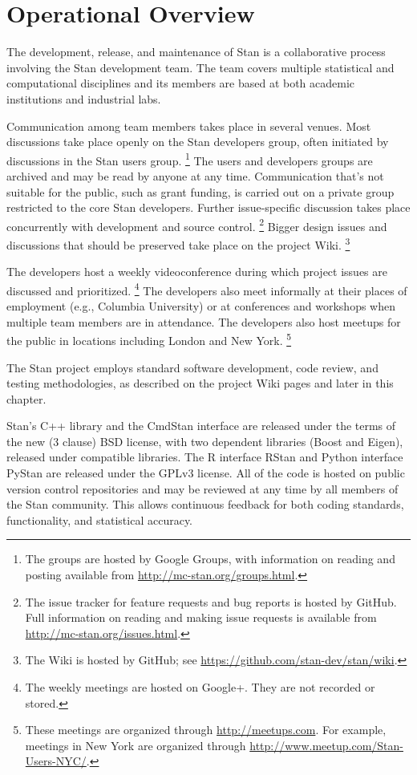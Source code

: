 \section{Operational Overview}

The development, release, and maintenance of Stan is a collaborative
process involving the Stan development team.  The team covers multiple
statistical and computational disciplines and its members are based at
both academic institutions and industrial labs.

Communication among team members takes place in several venues.  Most
discussions take place openly on the Stan developers group, often
initiated by discussions in the Stan users group.%
%
\footnote{The groups are hosted by Google Groups, with information on
  reading and posting available from \url{http://mc-stan.org/groups.html}.}
%
The users and developers groups are archived and may be read by
anyone at any time. Communication that's not suitable for the public,
such as grant funding, is carried out on a private group restricted to
the core Stan developers. Further issue-specific discussion takes
place concurrently with development and source control.%
%
\footnote{The issue tracker for feature requests and bug reports is
  hosted by GitHub.  Full information on reading and making issue
  requests is available from \url{http://mc-stan.org/issues.html}.}
%
Bigger design issues and discussions that should be preserved take
place on the project Wiki.%
%
\footnote{The Wiki is hosted by GitHub; see
  \url{https://github.com/stan-dev/stan/wiki}.}

The developers host a weekly videoconference during which project
issues are discussed and prioritized.%
%
\footnote{The weekly meetings are hosted on Google+.  They are not
  recorded or stored.}
%
The developers also meet informally at their places of employment
(e.g., Columbia University) or at conferences and workshops when
multiple team members are in attendance.  The developers also host
meetups for the public in locations including London and New York.%
%
\footnote{These meetings are organized through
  \url{http://meetups.com}.  For example, meetings in New York are
  organized through \url{http://www.meetup.com/Stan-Users-NYC/}.}

The Stan project employs standard software development, code review,
and testing methodologies, as described on the project Wiki pages
and later in this chapter.

Stan's C++ library and the CmdStan interface are released under the
terms of the new (3 clause) BSD license, with two dependent libraries
(Boost and Eigen), released under compatible libraries. The R
interface RStan and Python interface PyStan are released under the
GPLv3 license. All of the code is hosted on public version control
repositories and may be reviewed at any time by all members of the
Stan community.  This allows continuous feedback for both coding
standards, functionality, and statistical accuracy.

